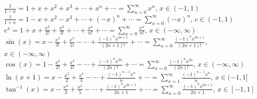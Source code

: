 \documentclass[14pt]{article}
\begin{document}
    $\frac{1}{1-x}=1+x+x^2+x^3+\cdots+x^n+\cdots=\sum\limits_{n=0}^\infty
    x^n$, $x\in(-1,1)$\\
    $\frac{1}{1+x}=1-x+x^2-x^3+\cdots+(-x)^n+\cdots=\sum\limits_{x=0}^\infty
    (-x)^n$, $c\in(-1,1)$\\
    $e^x=1+x+\frac{x^2}{2!}+\frac{x^3}{3!}+\cdots+\frac{x^n}{n!}+\cdots=\sum\limits_{x=0}^\infty\frac{x^n}{n!}$,
    $x\in(-\infty, \infty)$\\
    $\sin(x)=x-\frac{x^3}{3!}+\frac{x^5}{5!}-\cdots+\frac{(-1)^nx^{2n+1}}{(2n+1)!}+\cdots=\sum\limits_{n=0}^\infty
    \frac{(-1)^nx^{2n+1}}{(2n+1)!}$, $x\in(-\infty, \infty)$\\
    $\cos(x)=1-\frac{x^2}{2!}+\frac{x^4}{4!}-\cdots+\frac{(-1)^nx^{2n}}{(2n)!}+\cdots=\sum\limits_{n=0}^\infty\frac{(-1)^nx^{2n}}{(2n)!}$,
    $x\in(-\infty, \infty)$\\
    $\ln(x+1)=x-\frac{x^2}{2}+\frac{x^3}{3}-\cdots+\frac{(-1)^{n-1}x^n}{n}+\cdots=\sum\limits_{x=1}^\infty\frac{(-1)^{n-1}x^n}{n}$,
    $x\in(-1,1]$\\
    $\tan^{-1}(x)=x-\frac{x^3}{3}+\frac{x^5}{5}-\cdots+\frac{(-1)^nx^{2n+1}}{2n+1}+\cdots=\sum\limits_{x=0}^\infty\frac{(-1)^nx^{2n+1}}{2n+1}$,
    $x\in[-1,1]$\\
\end{document}
